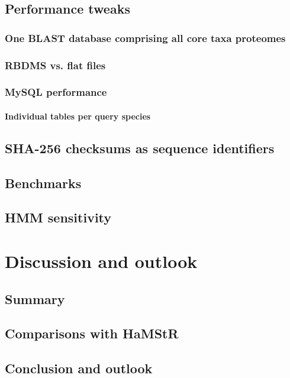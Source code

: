 \documentclass[a4paper,12pt]{scrreprt}
\newcommand{\hamstr}{HaMStR\xspace}
\begin{document}
	\section{Performance tweaks}
		\subsection{One BLAST database comprising all core taxa proteomes}
			
		\subsection{RBDMS vs. flat files}
		\subsection{MySQL performance}
		\subsubsection{Individual tables per query species}
	\section{SHA-256 checksums as sequence identifiers}
		
	\section{Benchmarks}
	\section{HMM sensitivity}
		

\chapter{Discussion and outlook}
	
	\section{Summary}
	\section{Comparisons with \hamstr}
	\clearpage
	\section{Conclusion and outlook}
	\clearpage

{}


\clearpage
\end{document}
